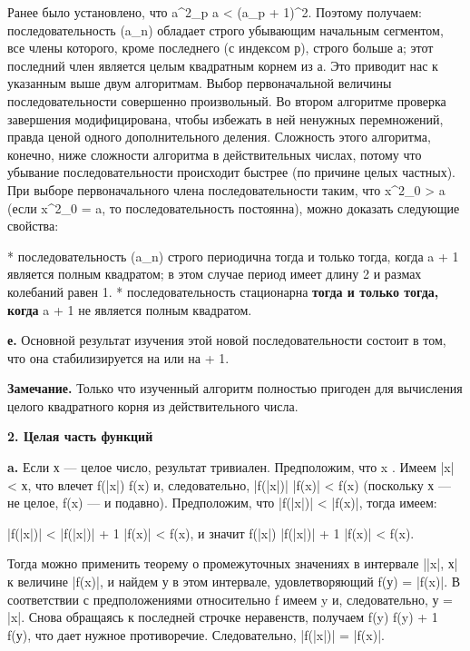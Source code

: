 Ранее было установлено, что a^{2}_{p} \leqslant a < (a_{p} + 1)^{2}. Поэтому получаем: последовательность (a_{n}) обладает строго убывающим начальным сегментом, все члены которого, кроме последнего (с индексом р), строго больше а; этот последний член является целым квадратным корнем из а. Это приводит нас к указанным выше двум алгоритмам. Выбор первоначальной величины последовательности совершенно произвольный. Во втором алгоритме проверка завершения модифицирована, чтобы избежать в ней ненужных перемножений, правда ценой одного дополнительного деления. Сложность этого алгоритма, конечно, ниже сложности алгоритма в действительных числах, потому что убывание последовательности происходит быстрее (по причине целых частных). При выборе первоначального члена последовательности таким, что x^{2}_{0} > a (если x^{2}_{0} = a, то последовательность постоянна), можно доказать следующие свойства:

* последовательность (a_{n}) строго периодична тогда и только тогда, когда a + 1 является полным квадратом; в этом случае период имеет длину 2 и размах колебаний равен 1.
* последовательность стационарна \textbf{тогда и только тогда, когда} a + 1 не является полным квадратом.

\textbf{е.} Основной результат изучения этой новой последовательности состоит в том, что она стабилизируется на \lfloor {} \rfloor или на \lfloor {} \rfloor + 1.

\textbf{Замечание.} Только что изученный алгоритм полностью пригоден для вычисления целого квадратного корня из действительного числа.

\textbf{2. Целая часть функций}

\textbf{a.} Если х — целое число, результат тривиален. Предположим, что x\notin {} . Имеем |x| < х, что влечет f(|x|) \leqslant f(x) и, следовательно, |f(|x|)| \leqslant |f(x)| < f(x) (поскольку х — не целое, f(x) — и подавно). Предположим, что |f(|x|)| < |f(x)|, тогда имеем:

|f(|x|)| < |f(|x|)| + 1 \leqslant |f(x)| < f(x),
и значит f(|x|) \leqslant |f(|x|)| + 1 \leqslant |f(x)| < f(x).

Тогда можно применить теорему о промежуточных значениях в интервале ||x|, х| к величине |f(x)|, и найдем у в этом интервале, удовлетворяющий f(у) = |f(x)|. В соответствии с предположениями относительно f имеем y \in {} и, следовательно, у = |x|. Снова обращаясь к последней строчке неравенств, получаем f(y) \leqslant f(y) + 1 \leqslant f(у), что дает нужное противоречие. Следовательно, |f(|x|)| = |f(x)|.

